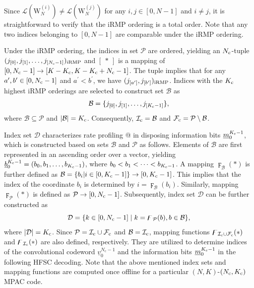 \documentclass[12pt, draftclsnofoot, peerreview, onecolumn]{IEEEtran}
\makeatletter
\theoremstyle{noparent}
\newcommand{\Rmnum}[1]{\expandafter\@slowromancap\romannumeral #1@}
\makeatother
\begin{document}
Since ${\mathcal{L}}(\mathrm{W}_{N}^{(i)}) \neq {\mathcal{L}}(\mathrm{W}_{N}^{(j)})$ for any $i,j\in[0,N-1]$ and $i\neq j$,
it is straightforward to verify that the iRMP ordering is a total order.
Note that any two indices belonging to $[0,N-1]$ are comparable under the iRMP ordering.

Under the iRMP ordering, the indices in set $\mathcal{P}$ are
ordered, yielding an $N_{\rm c}$-tuple 
$(j_{[0]},j_{[1]},\ldots,\\j_{[N_{\rm c}-1]})_{\rm iRMP}$
and $[\ *\ ]$ is a mapping of $[0,N_{\rm c}-1] \to [K-K_{\rm c},K-K_{\rm c}+N_{\rm c}-1]$.
The tuple implies that for any $a^\prime,b^\prime \in[0,N_{\rm c}-1]$ and 
$a^\prime < b^\prime$, we have $(j_{[a^\prime]},j_{[b^\prime]})_{\rm iRMP}$.
Indices with the $K_{\rm c}$ highest iRMP orderings are 
selected to construct set $\mathcal{B}$ as
\begin{equation}
    \mathcal{B} = \{j_{[0]}, j_{[1]},\ldots, j_{[K_{\rm c}-1]}\},
    \label{B_set}
\end{equation}
where $\mathcal{B} \subseteq \mathcal{P}$ and $|\mathcal{B}|=K_{\rm c}$.
Consequently, $\mathcal{I}_{\rm c}=\mathcal{B}$ and 
$\mathcal{F}_{\rm c}=\mathcal{P}\setminus\mathcal{B}$. 



 
Index set $\mathcal{D}$ characterizes rate profiling \Rmnum{1} 
in disposing information bits $\underline{m}_{0}^{K_{\rm c}-1}$,
which is constructed based on sets $\mathcal{B}$ and $\mathcal{P}$ as follows.
Elements of $\mathcal{B}$ are first represented in an ascending order over a vector, 
yielding $\underline{b}_{0}^{K_{\rm c}-1}=\left(b_{0}, b_{1},\ldots, b_{K_{\rm c}-1}\right)$,
where $b_{0}< b_{1}<\cdots< b_{K_{\rm c}-1}$.
A mapping $\digamma_{\mathcal{B}}(*)$ is further defined as $\mathcal{B}=\{b_i|i\in[0,K_{\rm c}-1]\}\to[0, K_{\rm c}-1]$.
This implies that the index of the coordinate $b_i$ is determined by $i=\digamma_{\mathcal{B}}(b_i)$.
Similarly, mapping $\digamma_{\mathcal{P}}(*)$ is defined as $\mathcal{P}\to[0, N_{\rm c}-1]$.
Subsequently, index set $\mathcal{D}$ can be further constructed as 
\begin{equation}
    \mathcal{D}=\{k\in [0,N_{\rm c}-1] \mid k=\digamma_{\mathcal{P}}(b), b\in \mathcal{B}\},
    \label{D_set}
\end{equation}
where $|\mathcal{D}|=K_{\rm c}$.
Since $\mathcal{P}=\mathcal{I}_{\rm c} \cup \mathcal{F}_{\rm c}$ and
$\mathcal{B}=\mathcal{I}_{\rm c}$, mapping functions 
$\digamma_{\mathcal{I}_{\rm c} \cup \mathcal{F}_{\rm c}}(*)$ and 
$\digamma_{\mathcal{I}_{\rm c}}(*)$ are also defined, respectively. 
They are utilized to determine indices of the convolutional codeword 
$\underline{v}_{0}^{N_{\mathrm c}-1}$ and the information bits 
$\underline{m}_{0}^{K_{\rm c}-1}$ in the following HFSC decoding.
Note that the above mentioned index sets and mapping functions 
are computed once offline for a particular $(N,K)$-$(N_{\rm c},K_{\rm c})$ MPAC code.
\end{document}
